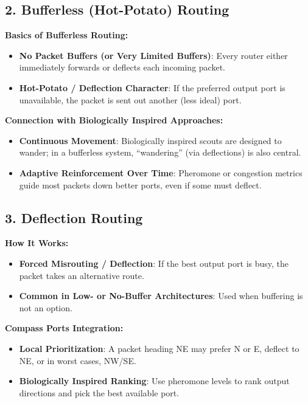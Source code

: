 \documentclass[../OAE-SPEC-MAIN.tex]{subfiles}
\begin{document}
\subsection*{2. Bufferless (Hot-Potato) Routing}

\textbf{Basics of Bufferless Routing:}
\begin{itemize}
    \item \textbf{No Packet Buffers (or Very Limited Buffers)}: Every router either immediately forwards or deflects each incoming packet.
    \item \textbf{Hot-Potato / Deflection Character}: If the preferred output port is unavailable, the packet is sent out another (less ideal) port.
\end{itemize}

\textbf{Connection with Biologically Inspired Approaches:}
\begin{itemize}
    \item \textbf{Continuous Movement}: Biologically inspired scouts are designed to wander; in a bufferless system, “wandering” (via deflections) is also central.
    \item \textbf{Adaptive Reinforcement Over Time}: Pheromone or congestion metrics guide most packets down better ports, even if some must deflect.
\end{itemize}

\subsection*{3. Deflection Routing}

\textbf{How It Works:}
\begin{itemize}
    \item \textbf{Forced Misrouting / Deflection}: If the best output port is busy, the packet takes an alternative route.
    \item \textbf{Common in Low- or No-Buffer Architectures}: Used when buffering is not an option.
\end{itemize}

\textbf{Compass Ports Integration:}
\begin{itemize}
    \item \textbf{Local Prioritization}: A packet heading NE may prefer N or E, deflect to NE, or in worst cases, NW/SE.
    \item \textbf{Biologically Inspired Ranking}: Use pheromone levels to rank output directions and pick the best available port.
\end{itemize}
\end{document}
